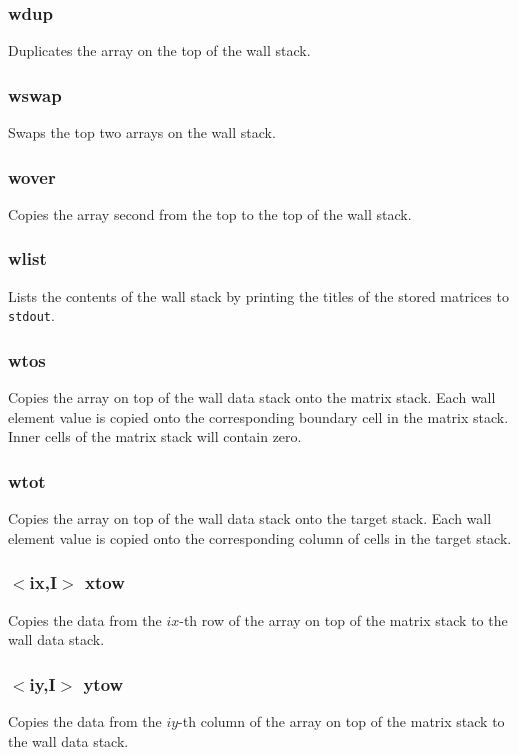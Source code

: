 \documentclass[a4paper,10pt]{report}
\begin{document}
\subsubsection{wdup}\label{sec:wdup}
Duplicates the array on the top of the wall stack.

\subsubsection{wswap}\label{sec:wswap}
Swaps the top two arrays on the wall stack.

\subsubsection{wover}\label{sec:wover}
Copies the array second from the top to the top of the wall stack.

\subsubsection{wlist}\label{sec:wlist}
Lists the contents of the wall stack by printing the titles
of the stored matrices to {\tt stdout}.

\subsubsection{wtos}\label{sec:wtos}
Copies the array on top of the wall data stack onto the matrix stack. Each wall element
value is copied onto the corresponding boundary cell in the matrix stack. Inner cells
of the matrix stack will contain zero.

\subsubsection{wtot}\label{sec:wtot}
Copies the array on top of the wall data stack onto the target stack. Each wall element
value is copied onto the corresponding column of cells in the target stack.

\subsubsection{$<$ix,{\bf I}$>$ xtow}\label{sec:xtow}
Copies the data from the $ix$-th row of the array on top of the matrix stack to the wall data stack.

\subsubsection{$<$iy,{\bf I}$>$ ytow}\label{sec:ytow}
Copies the data from the $iy$-th column of the array on top of the matrix stack to the wall data stack.
\end{document}

